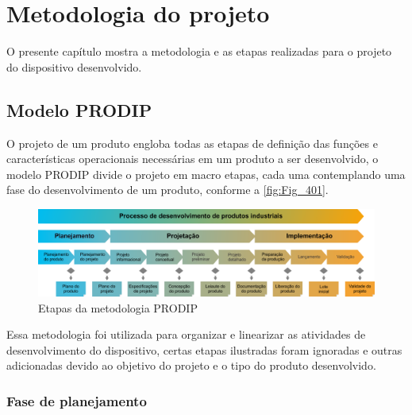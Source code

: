 


\chapter{Metodologia do projeto}%
%

O presente capítulo mostra a metodologia e as etapas realizadas para o projeto do dispositivo desenvolvido.

\section{Modelo PRODIP}

O projeto de um produto engloba todas as etapas de definição das funções e características operacionais necessárias em um produto a ser desenvolvido, o modelo PRODIP divide o projeto em macro etapas, cada uma contemplando uma fase do desenvolvimento de um produto, conforme a \autoref{fig:Fig_401}.

\begin{figure}[htb]
	\caption{\label{fig:Fig_401}Etapas da metodologia PRODIP}
	\begin{center}
		\includegraphics[width=\textwidth]{images/img401.png}
	\end{center}
\end{figure}

Essa metodologia foi utilizada para organizar e linearizar as atividades de desenvolvimento do dispositivo, certas etapas ilustradas foram ignoradas e outras adicionadas devido ao objetivo do projeto e o tipo do produto desenvolvido.

\subsection{Fase de planejamento}

